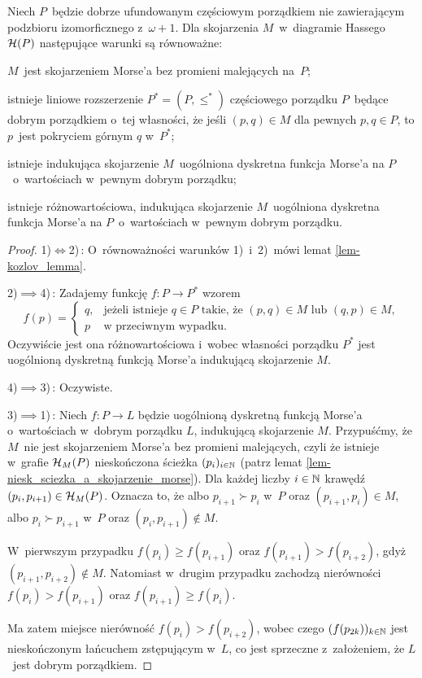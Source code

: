\begin{stw}\label{stw-charakteryzacja_skojarzen_bez_promieni_poprzez_funkcje_morsea_i_porzadki}
Niech $P$~będzie dobrze ufundowanym częściowym porządkiem nie zawierającym podzbioru izomorficznego z~$\omega+ 1$. Dla skojarzenia $M$~w~diagramie Hassego $\mathcal{H}(P)$ następujące warunki są równoważne:
\begin{compactenum}[\quad\ 1)]
\item $M$~jest skojarzeniem Morse'a bez promieni malejących na~$P$;
\item istnieje liniowe rozszerzenie $P^*=(P,\leq^*)$ częściowego porządku $P$~będące dobrym porządkiem o~tej własności, że jeśli $(p,q)\in M$ dla pewnych $p,q\in P$, to $p$~jest pokryciem górnym $q$ w~$P^*$;
\item istnieje indukująca skojarzenie $M$~uogólniona dyskretna funkcja Morse'a na $P$~o~wartościach w~pewnym dobrym porządku;
\item istnieje różnowartościowa, indukująca skojarzenie $M$~uogólniona dyskretna funkcja Morse'a na $P$~o~wartościach w~pewnym dobrym porządku.
\end{compactenum}
\end{stw}
\begin{proof}
1)$\iff$2)\,: O~równoważności warunków 1)~i~2)~mówi lemat \ref{lem-kozlov_lemma}.

2)$\implies$4)\,: Zadajemy funkcję $f\colon P\to P^*$ wzorem 
\[f(p)=\begin{cases}q, & \text{jeżeli istnieje } q\in P \text{ takie, że } (p,q)\in M \text{ lub } (q,p)\in M,\\
p & \text{w przeciwnym wypadku.}
 \end{cases}\]
Oczywiście jest ona różnowartościowa i~wobec własności porządku $P^*$ jest uogólnioną dyskretną funkcją Morse'a indukującą skojarzenie $M$.

4)$\implies$3)\,: Oczywiste.

3)$\implies$1)\,: Niech $f\colon P\to L$ będzie uogólnioną dyskretną funkcją Morse'a o~wartościach w~dobrym porządku $L$, indukującą skojarzenie $M$. Przypuśćmy, że $M$~nie jest skojarzeniem Morse'a bez promieni malejących, czyli że istnieje w~grafie $\mathcal{H}_M(P)$ nieskończona ścieżka $(p_i)_{i\in\mathbb{N}}$ (patrz lemat \ref{lem-niesk_sciezka_a_skojarzenie_morse}). Dla każdej liczby $i\in\mathbb{N}$ krawędź $(p_i,p_{i+1})\in\mathcal{H}_M(P)$. Oznacza to, że albo $p_{i+1}\succ p_{i}$ w~$P$ oraz $(p_{i+1},p_i)\in M$, albo $p_i\succ p_{i+1}$ w~$P$ oraz $(p_i,p_{i+1})\not\in M$.

W~pierwszym przypadku $f(p_i)\geq f(p_{i+1})$ oraz $f(p_{i+1})>f(p_{i+2})$, gdyż $(p_{i+1},p_{i+2})\not\in M$. Natomiast w~drugim przypadku zachodzą nierówności $f(p_i)>f(p_{i+1})$ oraz $f(p_{i+1})\geq f(p_i)$. 

Ma zatem miejsce nierówność $f(p_i)>f(p_{i+2})$, wobec czego $(f(p_{2k}))_{k\in\mathbb{N}}$ jest nieskończonym łańcuchem zstępującym w~$L$, co jest sprzeczne z~założeniem, że $L$~jest dobrym porządkiem.
\end{proof}

